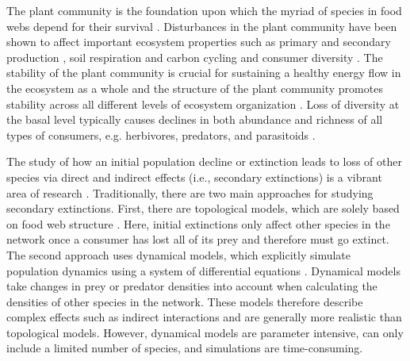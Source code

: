 \documentclass[12pt]{article}
\begin{document}
\begin{spacing}{2.0}
     The plant community is the foundation upon which the myriad of species in food webs depend for their survival \citep{}. Disturbances in the plant community have been shown to affect important ecosystem properties such as primary \citep{} and secondary production \citep{}, soil respiration and carbon cycling \citep{} and consumer diversity \citep{scherber2010bottom, Baiser2016}. The stability of the plant community is crucial for sustaining a healthy energy flow in the ecosystem as a whole \citep{Rosenblatt2016} and the structure of the plant community promotes stability across all different levels of ecosystem organization \citep{proulx2010diversity,scherber2010bottom}. Loss of diversity at the basal level typically causes declines in both abundance and richness of all types of consumers, e.g. herbivores, predators, and parasitoids \citep{scherber2010bottom}.
    
    The study of how an initial population decline or extinction leads to loss of other species via direct and indirect effects (i.e., secondary extinctions) is a vibrant area of research \citep{curtsdotter2011robustness, dunne2009cascading, Eklof2006}. Traditionally, there are two main approaches for studying secondary extinctions. First, there are topological models, which are solely based on food web structure \citep{dunne2009cascading}. Here, initial extinctions only affect other species in the network once a consumer has lost all of its prey and therefore must go extinct. The second approach uses dynamical models, which explicitly simulate population dynamics using a system of differential equations \citep{binzer2011susceptibility}. Dynamical models take changes in prey or predator densities into account when calculating the densities of other species in the network. These models therefore describe complex effects such as indirect interactions and are generally more realistic than topological models. However, dynamical models are parameter intensive, can only include a limited number of species, and simulations are time-consuming. 
    

\end{spacing}
\end{document}
